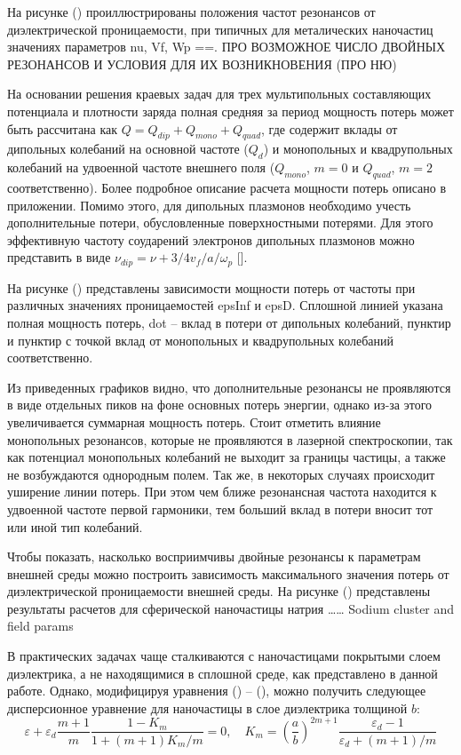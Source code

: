 \documentclass[12pt, a4paper]{article}
\def \eps {\varepsilon}
\def \w {\omega}
\begin{document}
На рисунке () проиллюстрированы положения частот резонансов от диэлектрической проницаемости, при типичных для металических наночастиц значениях параметров nu, Vf, Wp ==. ПРО ВОЗМОЖНОЕ ЧИСЛО ДВОЙНЫХ РЕЗОНАНСОВ И УСЛОВИЯ ДЛЯ ИХ ВОЗНИКНОВЕНИЯ (ПРО НЮ)

На основании решения краевых задач для трех мультипольных составляющих потенциала и плотности заряда полная средняя за период мощность потерь может быть рассчитана как $Q = Q_{dip} + Q_{mono} + Q_{quad}$, где  содержит вклады от дипольных колебаний на основной частоте ($Q_d$) и монопольных и квадрупольных колебаний на удвоенной частоте внешнего поля ($Q_{mono}$, $m=0$ и $Q_{quad}$, $m=2$ соответственно). Более подробное описание расчета мощности потерь описано в приложении. Помимо этого, для дипольных плазмонов необходимо учесть дополнительные потери, обусловленные поверхностными потерями. Для этого эффективную частоту соударений электронов дипольных плазмонов можно представить в виде $\nu_{dip} = \nu + 3/4 v_f / a / \w_p$ [].

На рисунке () представлены зависимости мощности потерь от частоты при различных значениях проницаемостей epsInf и epsD. Сплошной линией указана полная мощность потерь, dot – вклад в потери от дипольных колебаний, пунктир и пунктир с точкой вклад от монопольных и квадрупольных колебаний соответственно. 

Из приведенных графиков видно, что дополнительные резонансы не проявляются в виде отдельных пиков на фоне основных потерь энергии, однако из-за этого увеличивается суммарная мощность потерь. Стоит отметить влияние монопольных резонансов, которые не проявляются в лазерной спектроскопии, так как потенциал монопольных колебаний не выходит за границы частицы, а также не возбуждаются однородным полем. Так же, в некоторых случаях происходит уширение линии потерь. При этом чем ближе резонансная частота находится к удвоенной частоте первой гармоники, тем больший вклад в потери вносит тот или иной тип колебаний.

Чтобы показать, насколько восприимчивы двойные резонансы к параметрам внешней среды можно построить зависимость максимального значения потерь от диэлектрической проницаемости внешней среды. На рисунке () представлены результаты расчетов для сферической наночастицы натрия ……  Sodium cluster and field params 

В практических задачах чаще сталкиваются с наночастицами покрытыми слоем диэлектрика, а не находящимися в сплошной среде, как представлено в данной работе. Однако, модифицируя уравнения () – (), можно получить следующее дисперсионное уравнение для наночастицы в слое диэлектрика толщиной $b$:
\begin{equation} 	
	\eps + \eps_d\frac{m+1}{m}  \frac{1-K_m}{1 + (m+1)K_m/m} = 0, \quad K_m = (\frac{a}{b})^{2m+1} \frac{\eps_d - 1}{\eps_d + (m+1)/m}
\end{equation}
\end{document}
